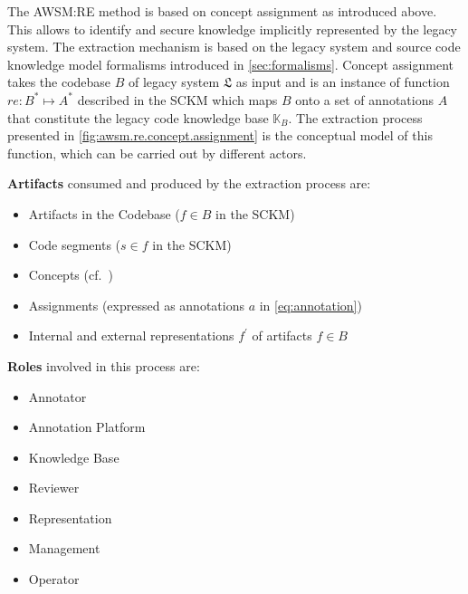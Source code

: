 The AWSM:RE method is based on concept assignment as introduced above.
This allows to identify and secure knowledge implicitly represented by the legacy system.
The extraction mechanism is based on the legacy system and source code knowledge model formalisms introduced in \cref{sec:formalisms}.
Concept assignment takes the codebase \(B\) of legacy system \(\mathfrak{L}\) as input and is an instance of function \(re: B^* \mapsto A^*\) described in the SCKM which maps \(B\) onto a set of annotations \(A\) that constitute the legacy code knowledge base \(\mathbb{K}_{B}\).
The extraction process presented in \cref{fig:awsm.re.concept.assignment} is the conceptual model of this function, which can be carried out by different actors.

\textbf{Artifacts} consumed and produced by the extraction process are:

\begin{itemize}
\tightlist
\item
  Artifacts in the Codebase (\(f \in B\) in the SCKM)
\item
  Code segments (\(s \in f\) in the SCKM)
\item
  Concepts (cf.~\autocite{def:concept})
\item
  Assignments (expressed as annotations \(a\) in \cref{eq:annotation})
\item
  Internal and external representations \(f^{'}\) of artifacts \(f \in B\)
\end{itemize}

\textbf{Roles} involved in this process are:

\begin{itemize}
\tightlist
\item
  Annotator
\item
  Annotation Platform
\item
  Knowledge Base
\item
  Reviewer
\item
  Representation
\item
  Management
\item
  Operator
\end{itemize}

